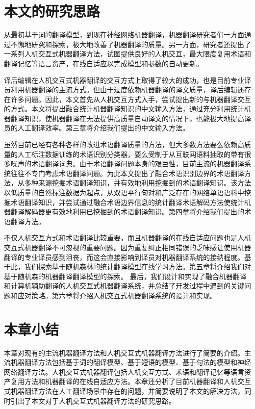 \section{本文的研究思路}

从最初基于词的翻译模型，到现在神经网络机器翻译，机器翻译研究者们一方面通过不懈地研究和探索，极大地改善了机器翻译的质量。另一方面，研究者还提出了一系列人机交互式机器翻译方法，试图提供良好的人机交互，最大限度复用术语和翻译记忆等语言资产，在线自适应以完成模型和参数的自动更新。

译后编辑在人机交互式机器翻译的交互方式上取得了较大的成功，也是目前专业译员利用机器翻译的主流方式。但由于过度依赖机器翻译的译文质量，译后编辑还存在许多问题。因此，本文首先从人机交互方式入手，尝试提出新的与机器翻译交互的方式。本文将提出融合统计机器翻译知识的中文输入方法，通过充分利用统计机器翻译知识，使机器翻译在无法提供高质量自动译文的情况下，也能极大地提高译员的人工翻译效率。第三章将介绍我们提出的中文输入方法。

虽然目前已经有各种各样的改进术语翻译质量的方法，但大多数方法要么依赖高质量的人工标注数据训练的术语识别分类器，要么受制于从互联网语料抽取的带有很多噪声的术语翻译词典。由于术语翻译问题本身的艰巨性，目前主流的机器翻译系统往往不专门考虑术语翻译问题。为此本文提出了融合术语识别边界的术语翻译方法，从多种来源挖掘术语翻译知识，并有效地利用挖掘到的术语翻译知识。该方法以低质量的自然标注数据为起点，从双语平行句对和广泛存在的网络单语语料中挖掘术语翻译知识，并尝试通过融合术语边界信息的统计翻译术语解码方法使统计机器翻译解码器更有效地利用已挖掘到的术语翻译知识。第四章将介绍我们提出的术语翻译方法。

不仅人机交互方式和术语翻译比较重要，而且机器翻译的在线自适应问题也是人机交互式机器翻译不可忽视的重要问题。因为重复纠正相同错误的乏味感让使用机器翻译的专业译员感到沮丧，而这会直接影响到译员对机器翻译系统的接纳程度。基于此，我们探索基于随机森林的统计翻译模型在线学习方法。第五章将介绍我们对基于随机森的机器翻译翻译模型的探索。
最后，我们设计和实现了融合机器翻译和计算机辅助翻译的人机交互式机器翻译系统，并总结了开发过程中遇到的关键问题和应对策略。第六章将介绍人机交互式机器翻译系统的设计和实现。

\section{本章小结}

本章对现有的主流机器翻译方法和人机交互式机器翻译方法进行了简要的介绍。主流机器翻译方法包括基于词的翻译模型、基于短语的模型、基于句法的模型和神经网络翻译方法。人机交互式机器翻译包括人机交互方式、术语和翻译记忆等语言资产复用方法和机器翻译的在线自适应方法。本章还分析了目前机器翻译和人机交互式机器翻译方法在人工翻译场景中存在的问题，并简要说明了本文的解决方法，同时引出了本文对于人机交互式机器翻译方法的研究思路。
